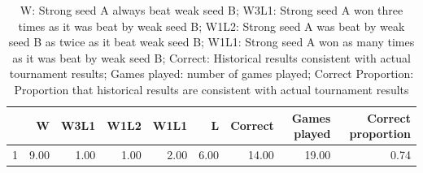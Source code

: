\documentclass{article} %
\begin{document}
\begin{table}[ht]
\centering
\begin{tabular}{rrrrrrrrr}
\hline
& W & W3L1 & W1L2 & W1L1 & L & Correct & Games played & Correct proportion \\ 
\hline
1 & 9.00 & 1.00 & 1.00 & 2.00 & 6.00 & 14.00 & 19.00 & 0.74 \\ 
\hline
\end{tabular}

\caption{W: Strong seed A always beat weak seed B; W3L1: Strong seed A won three times as it was beat by weak seed B; W1L2: Strong seed A was beat by weak seed B as twice as it beat weak seed B; W1L1: Strong seed A won as many times as it was beat by weak seed B; Correct: Historical results consistent with actual tournament results; Games played: number of games played; Correct Proportion: Proportion that historical results are consistent with actual tournament results}
\end{table}
\end{document}
